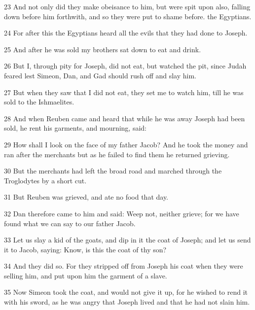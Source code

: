 \par 23 And not only did they make obeisance to him, but were spit upon also, falling down before him forthwith, and so they were put to shame before. the Egyptians.

\par 24 For after this the Egyptians heard all the evils that they had done to Joseph.

\par 25 And after he was sold my brothers sat down to eat and drink.

\par 26 But I, through pity for Joseph, did not eat, but watched the pit, since Judah feared lest Simeon, Dan, and Gad should rush off and slay him.

\par 27 But when they saw that I did not eat, they set me to watch him, till he was sold to the Ishmaelites.

\par 28 And when Reuben came and heard that while he was away Joseph had been sold, he rent his garments, and mourning, said:

\par 29 How shall I look on the face of my father Jacob? And he took the money and ran after the merchants but as he failed to find them he returned grieving.

\par 30 But the merchants had left the broad road and marched through the Troglodytes by a short cut.

\par 31 But Reuben was grieved, and ate no food that day.

\par 32 Dan therefore came to him and said: Weep not, neither grieve; for we have found what we can say to our father Jacob.

\par 33 Let us slay a kid of the goats, and dip in it the coat of Joseph; and let us send it to Jacob, saying: Know, is this the coat of thy son?

\par 34 And they did so. For they stripped off from Joseph his coat when they were selling him, and put upon him the garment of a slave.

\par 35 Now Simeon took the coat, and would not give it up, for he wished to rend it with his sword, as he was angry that Joseph lived and that he had not slain him.

